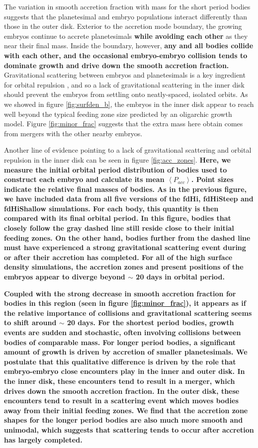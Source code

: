 \documentclass[twocolumn,linenumbers]{aastex63}
\begin{document}
The variation in smooth accretion fraction with mass for the short period bodies suggests that the planetesimal and embryo populations interact differently than those in the outer disk. Exterior to the accretion mode boundary, the growing embryos continue to accrete planetesimals \textbf{while avoiding each other} as they near their final mass. Inside the boundary, however, \textbf{any and all bodies collide with each other, and the occasional embryo-embryo collision tends to dominate growth and drive down the smooth accretion fraction.} Gravitational scattering between embryos and planetesimals is a key ingredient for orbital repulsion \citep{kokubo98}, and so a lack of gravitational scattering in the inner disk should prevent the embryos from settling onto neatly-spaced, isolated orbits. As we showed in figure \ref{fig:surfden_b}, the embryos in the inner disk appear to reach well beyond the typical feeding zone size predicted by an oligarchic growth model. Figure \ref{fig:minor_frac} suggests that the extra mass here obtain comes from mergers with the other nearby embryos.

Another line of evidence pointing to a lack of gravitational
scattering and orbital repulsion in the inner disk can be seen in
figure \ref{fig:acc_zones}. \textbf{Here, we measure the initial orbital period distribution of bodies used to construct each embryo and calculate its mean $\left<  P_{acc} \right>$. Point sizes indicate the relative final masses of bodies. As in the previous figure, we have included data from all five versions of the fdHi, fdHiSteep and fdHiShallow simulations. For each body, this quantity is then compared with its final orbital period. In this figure, bodies that closely follow the gray dashed line still reside close to their initial feeding zones. On the other hand, bodies further from the dashed line must have experienced a strong gravitational scattering event during or after their accretion has completed. For all of the high surface density simulations, the accretion zones and present positions of the embryos appear to diverge beyond $\sim$ 20 days in orbital period.}

\textbf{Coupled with the strong decrease in smooth accretion fraction for bodies in this region (seen in figure \ref{fig:minor_frac}), it appears as if the relative importance of collisions and gravitational scattering seems to shift around $\sim$ 20 days. For the shortest period bodies, growth events are sudden and stochastic, often involving collisions between bodies of comparable mass. For longer period bodies, a significant amount of growth is driven by accretion of smaller planetesimals. We postulate that this qualitative difference is driven by the role that embryo-embryo close encounters play in the inner and outer disk. In the inner disk, these encounters tend to result in a merger, which drives down the smooth accretion fraction. In the outer disk, these encounters tend to result in a scattering event which moves bodies away from their initial feeding zones. We find that the accretion zone shapes for the longer period bodies are also much more smooth and unimodal, which suggests that scattering tends to occur after accretion has largely completed.}
\end{document}
